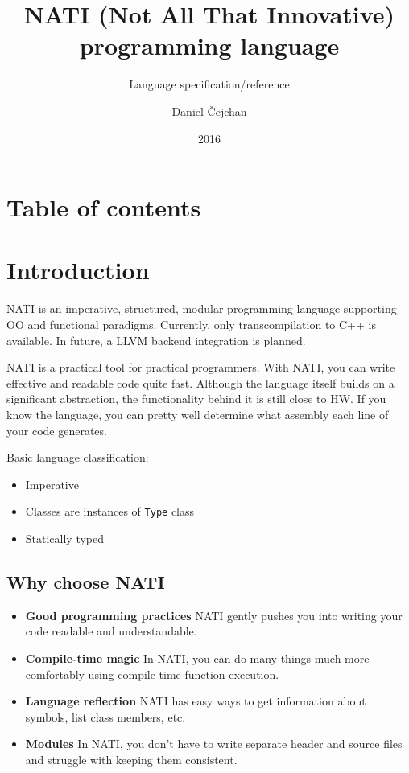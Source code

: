 





\setlength\extrarowheight{2pt}

\title{NATI (Not All That Innovative) programming language}
\subtitle{Language specification/reference}
\author{Daniel Čejchan}
\date{2016}



\mainpage

\chapter{Table of contents}
\makeatletter
{}
\makeatother

\chapter{Introduction}
NATI is an imperative, structured, modular programming language supporting OO and functional paradigms. Currently, only transcompilation to C++ is available. In future, a LLVM backend integration is planned.

NATI is a practical tool for practical programmers. With NATI, you can write effective and readable code quite fast. Although the language itself builds on a significant abstraction, the functionality behind it is still close to HW. If you know the language, you can pretty well determine what assembly each line of your code generates.

Basic language classification:
\begin{itemize}
	\item Imperative
	\item Classes are instances of \verb|Type| class
	\item Statically typed
\end{itemize}

\section{Why choose NATI}
\begin{itemize}
	\item \textbf{Good programming practices} NATI gently pushes you into writing your code readable and understandable.
	\item \textbf{Compile-time magic} In NATI, you can do many things much more comfortably using compile time function execution.
	\item \textbf{Language reflection} NATI has easy ways to get information about symbols, list class members, etc.
	\item \textbf{Modules} In NATI, you don't have to write separate header and source files and struggle with keeping them consistent.
\end{itemize}

